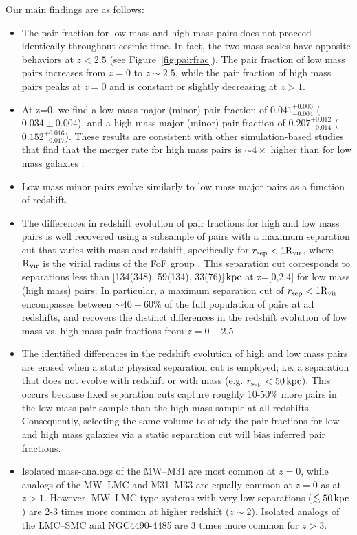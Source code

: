 \documentclass[linenumbers,twocolumn]{aastex631}
\newcommand{\Rvir}{\ensuremath{\rm R_{vir}}}
\begin{document}
Our main findings are as follows:
\begin{itemize}
    \item The pair fraction for low mass and high mass pairs does not proceed identically throughout cosmic time.
    In fact, the two mass scales have opposite behaviors at $z<2.5$ (see Figure~\ref{fig:pairfrac}).
    The pair fraction of low mass pairs increases from $z=0$ to $z\sim2.5$, while the pair fraction of high mass pairs peaks at $z=0$ and is constant or slightly decreasing at $z>1$.
    \item At z=0, we find a low mass major (minor) pair fraction of $0.041^{+0.003}_{-0.004}$ ($0.034\pm0.004$), and a high mass major (minor) pair fraction of $0.207^{+0.012}_{-0.014}$ ($0.152^{+0.016}_{-0.017}$). 
    These results are consistent with other simulation-based studies that find that the merger rate for high mass pairs is $\sim4\times$ higher than for low mass galaxies \citep[e.g.][]{RG2015}. 
    \item Low mass minor pairs evolve similarly to low mass major pairs as a function of redshift.
    \item The differences in redshift evolution of pair fractions for high and low mass pairs is well recovered using a subsample of pairs with a maximum separation cut that varies with mass and redshift, specifically for $r_{\mathrm{sep}}<1\Rvir$, where $\Rvir$ is the virial radius of the FoF group
    .
    This separation cut corresponds to separations less than [134(348), 59(134), 33(76)]$\mathrm{\,kpc}$ at z=[0,2,4] for low mass (high mass) pairs.
    In particular, a maximum separation cut of $r_{\mathrm{sep}}<1\Rvir$ encompasses between $\sim40-60\%$ of the full population of pairs at all redshifts, and recovers the distinct differences in the redshift evolution of low mass vs. high mass pair fractions from $z=0-2.5$. 
    \item The identified differences in the redshift evolution of high and low mass pairs are erased when a static physical separation cut is employed; i.e. a separation that does not evolve with redshift or with mass (e.g. $r_{\mathrm{sep}}<50\mathrm{\,kpc}$). 
    This occurs because fixed separation cuts capture roughly 10-50\% more pairs in the low mass pair sample than the high mass sample at all redshifts.  
    Consequently, selecting the same volume to study the pair fractions for low and high mass galaxies via a static separation cut will bias inferred pair fractions. 
    \item Isolated mass-analogs of the MW--M31 are most common at $z=0$, while analogs of the MW--LMC and M31--M33 are equally common at $z=0$ as at $z>1$. 
    However, MW--LMC-type systems with very low separations ($\lesssim50\mathrm{\,kpc}$) are 2-3 times more common at higher redshift ($z\sim$2). 
    Isolated analogs of the LMC--SMC and  NGC4490-4485 are 3 times more common for $z>3$. 
\end{itemize}
    
\end{document}

